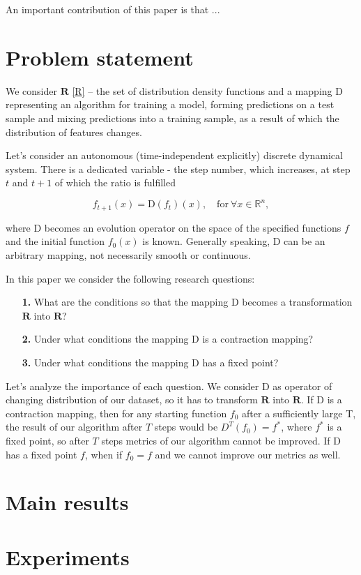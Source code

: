 \documentclass{article}
\begin{document}
    An important contribution of this paper is that ...

\section{Problem statement} \label{Problem_statement}

    We consider $\mathbf{R}$ \eqref{R} -- the set of distribution density functions and a mapping $\text{D}$ representing an algorithm for training a model, forming predictions on a test sample and mixing predictions into a training sample, as a result of which the distribution of features changes.

    Let's consider an autonomous (time-independent explicitly) discrete dynamical system. There is a dedicated variable - the step number, which increases, at step $t$ and $t+1$ of which the ratio is fulfilled

    \begin{equation*}
        f_{t+1}(x) = \text{D}(f_t)(x), \quad \text{for}~ \forall x \in \mathbb{R}^n,
    \end{equation*}

    where $\text{D}$ becomes an evolution operator on the space of the specified functions $f$ and the initial function $f_0(x)$ is known. Generally speaking, $\text{D}$ can be an arbitrary mapping, not necessarily smooth or continuous.

    In this paper we consider the following research questions:

    \begin{enumerate}
        \item[\textbf{1.}]  What are the conditions so that the mapping $\text{D}$ becomes a transformation $\mathbf{R}$ into $\mathbf{R}$? 

        \item[\textbf{2.}] Under what conditions the mapping $\text{D}$ is a contraction mapping?

        \item[\textbf{3.}] Under what conditions the mapping $\text{D}$ has a fixed point?
    \end{enumerate}

    Let's analyze the importance of each question. We consider $\text{D}$ as operator of changing distribution of our dataset, so it has to transform $\mathbf{R}$ into $\mathbf{R}$. If $\text{D}$ is a contraction mapping, then for any starting function $f_0$ after a sufficiently large T, the result of our algorithm after $T$ steps would be $D^T(f_0) = f^*$, where $f^*$ is a fixed point, so after $T$ steps metrics of our algorithm cannot be improved. If $\text{D}$ has a fixed point $f$, when if $f_0 = f$ and we cannot improve our metrics as well.


\section{Main results} \label{Main_results}

\section{Experiments} \label{Experiments}


  
\end{document}
